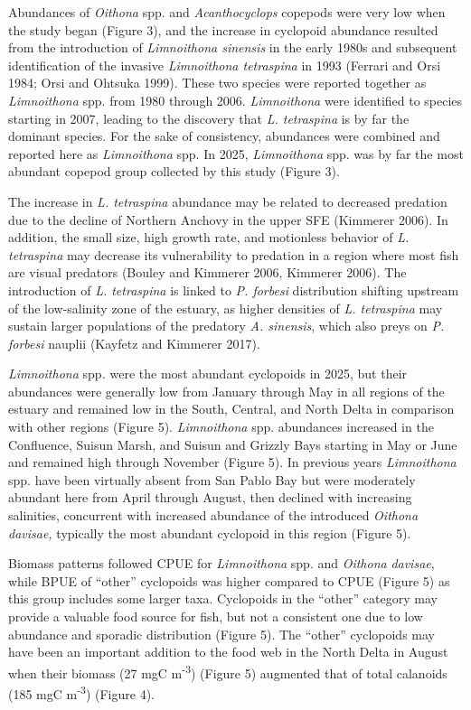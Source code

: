 \documentclass[
  letterpaper,
]{article}
\begin{document}
Abundances of \emph{Oithona} spp. and \emph{Acanthocyclops} copepods
were very low when the study began (Figure 3), and the increase in
cyclopoid abundance resulted from the introduction of \emph{Limnoithona
sinensis} in the early 1980s and subsequent identification of the
invasive \emph{Limnoithona tetraspina} in 1993 (Ferrari and Orsi 1984;
Orsi and Ohtsuka 1999). These two species were reported together as
\emph{Limnoithona} spp. from 1980 through 2006. \emph{Limnoithona} were
identified to species starting in 2007, leading to the discovery that
\emph{L. tetraspina} is by far the dominant species. For the sake of
consistency, abundances were combined and reported here as
\emph{Limnoithona} spp. In 2025, \emph{Limnoithona} spp. was by far the
most abundant copepod group collected by this study (Figure 3).

The increase in \emph{L. tetraspina} abundance may be related to
decreased predation due to the decline of Northern Anchovy in the upper
SFE (Kimmerer 2006). In addition, the small size, high growth rate, and
motionless behavior of \emph{L. tetraspina} may decrease its
vulnerability to predation in a region where most fish are visual
predators (Bouley and Kimmerer 2006, Kimmerer 2006). The introduction of
\emph{L. tetraspina} is linked to \emph{P. forbesi} distribution
shifting upstream of the low-salinity zone of the estuary, as higher
densities of \emph{L. tetraspina} may sustain larger populations of the
predatory \emph{A. sinensis}, which also preys on \emph{P. forbesi}
nauplii (Kayfetz and Kimmerer 2017).

\emph{Limnoithona} spp\emph{.} were the most abundant cyclopoids in
2025, but their abundances were generally low from January through May
in all regions of the estuary and remained low in the South, Central,
and North Delta in comparison with other regions (Figure 5).
\emph{Limnoithona} spp. abundances increased in the Confluence, Suisun
Marsh, and Suisun and Grizzly Bays starting in May or June and remained
high through November (Figure 5). In previous years \emph{Limnoithona}
spp. have been virtually absent from San Pablo Bay but were moderately
abundant here from April through August, then declined with increasing
salinities, concurrent with increased abundance of the introduced
\emph{Oithona davisae,} typically the most abundant cyclopoid in this
region (Figure 5).

Biomass patterns followed CPUE for \emph{Limnoithona} spp. and
\emph{Oithona} \emph{davisae}, while BPUE of ``other'' cyclopoids was
higher compared to CPUE (Figure 5) as this group includes some larger
taxa. Cyclopoids in the ``other'' category may provide a valuable food
source for fish, but not a consistent one due to low abundance and
sporadic distribution (Figure 5). The ``other'' cyclopoids may have been
an important addition to the food web in the North Delta in August when
their biomass (27 mgC m\textsuperscript{-3}) (Figure 5) augmented that
of total calanoids (185 mgC m\textsuperscript{-3}) (Figure 4).
\end{document}
